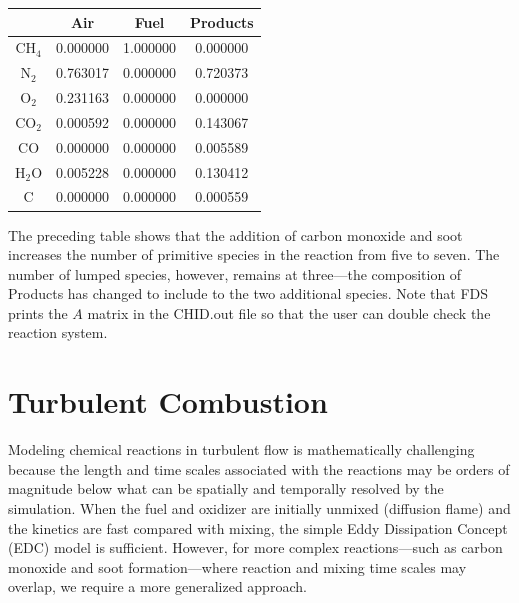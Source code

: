\begin{center}
\begin{tabular}{c c c c }
                   & Air & Fuel & Products \\ \hline
{CH$_4$}           & 0.000000 & 1.000000 & 0.000000 \\
{N$_2$}            & 0.763017 & 0.000000 & 0.720373 \\
{O$_2$}            & 0.231163 & 0.000000 & 0.000000 \\
{CO$_2$}           & 0.000592 & 0.000000 & 0.143067 \\
{CO}               & 0.000000 & 0.000000 & 0.005589 \\
{H$_2$O}           & 0.005228 & 0.000000 & 0.130412 \\
{C}                & 0.000000 & 0.000000 & 0.000559 \\
\end{tabular}
\end{center}

\noindent The preceding table shows that the addition of carbon monoxide and soot increases the number of primitive species in the reaction from five to seven. The number of lumped species, however, remains at three---the composition of Products has changed to include to the two additional species.  Note that FDS prints the $A$ matrix in the {\ct CHID.out} file so that the user can double check the reaction system.


\clearpage

\section{Turbulent Combustion}
\label{sec:batchreactormodel}

Modeling chemical reactions in turbulent flow is mathematically challenging because the length and time scales associated with the reactions may be orders of magnitude below what can be spatially and temporally resolved by the simulation.  When the fuel and oxidizer are initially unmixed (diffusion flame) and the kinetics are fast compared with mixing, the simple Eddy Dissipation Concept (EDC) model \cite{Magnussen:1,Poinsot:TNC} is sufficient.  However, for more complex reactions---such as carbon monoxide and soot formation---where reaction and mixing time scales may overlap, we require a more generalized approach.

